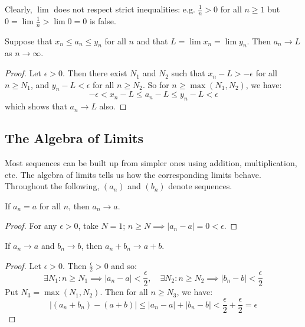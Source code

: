 \documentclass[11pt]{article}
\begin{document}
\begin{remark}
	Clearly, $\lim$ does not respect strict inequalities: e.g. $\frac{1}{n} > 0$ for all $n \geq 1$ but $0 = \lim \frac{1}{n} > \lim 0 = 0$ is false.
\end{remark}

\begin{theorem}
	Suppose that $x_n \leq a_n \leq y_n$ for all $n$ and that $L = \lim x_n = \lim y_n$. Then $a_n \to L$ as $n \to \infty$.
\end{theorem}

\begin{proof}
	Let $\epsilon > 0$. Then there exist $N_1$ and $N_2$ such that $x_n - L > -\epsilon$ for all $n \geq N_1$, and $y_n - L < \epsilon$ for all $n \geq N_2$. So for $n \geq \max(N_1, N_2)$, we have:
	\[
		-\epsilon < x_n - L \leq a_n - L \leq y_n - L < \epsilon
	\]
	which shows that $a_n \to L$ also.
\end{proof}

\subsection{The Algebra of Limits}
Most sequences can be built up from simpler ones using addition,
multiplication, etc. The algebra of limits tells us how the corresponding
limits behave. Throughout the following, $(a_n)$ and $(b_n)$ denote sequences.

\begin{proposition}
	If $a_n = a$ for all $n$, then $a_n \to a$.
\end{proposition}

\begin{proof}
	For any $\epsilon > 0$, take $N = 1$; $n \geq N \implies |a_n - a| = 0 < \epsilon$.
\end{proof}

\begin{proposition}
	If $a_n \to a$ and $b_n \to b$, then $a_n + b_n \to a + b$.
\end{proposition}

\begin{proof}
	Let $\epsilon > 0$. Then $\frac{\epsilon}{2} > 0$ and so:
	\[
		\exists N_1 : n \geq N_1 \implies |a_n - a| < \frac{\epsilon}{2}, \quad \exists N_2 : n \geq N_2 \implies |b_n - b| < \frac{\epsilon}{2}
	\]
	Put $N_3 = \max(N_1, N_2)$. Then for all $n \geq N_3$, we have:
	\[
		|(a_n + b_n) - (a + b)| \leq |a_n - a| + |b_n - b| < \frac{\epsilon}{2} + \frac{\epsilon}{2} = \epsilon
	\]
\end{proof}
\end{document}
